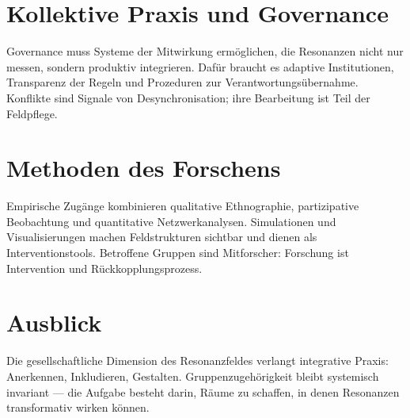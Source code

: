 \section{Kollektive Praxis und Governance}
Governance muss Systeme der Mitwirkung ermöglichen, die Resonanzen nicht nur messen, sondern produktiv integrieren. Dafür braucht es adaptive Institutionen, Transparenz der Regeln und Prozeduren zur Verantwortungsübernahme. Konflikte sind Signale von Desynchronisation; ihre Bearbeitung ist Teil der Feldpflege.

\section{Methoden des Forschens}
Empirische Zugänge kombinieren qualitative Ethnographie, partizipative Beobachtung und quantitative Netzwerkanalysen. Simulationen und Visualisierungen machen Feldstrukturen sichtbar und dienen als Interventionstools. Betroffene Gruppen sind Mitforscher: Forschung ist Intervention und Rückkopplungsprozess.

\section*{Ausblick}
Die gesellschaftliche Dimension des Resonanzfeldes verlangt integrative Praxis: Anerkennen, Inkludieren, Gestalten. Gruppenzugehörigkeit bleibt systemisch invariant — die Aufgabe besteht darin, Räume zu schaffen, in denen Resonanzen transformativ wirken können.

